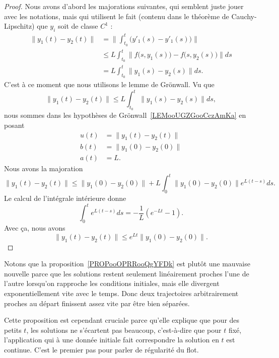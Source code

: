 \begin{proof}
	Nous avons d'abord les majorations suivantes, qui semblent juste jouer avec les notations, mais qui utilisent le fait (contenu dans le théorème de Cauchy-Lipschitz) que \( y_i\) soit de classe \( C^1\) :
	\begin{subequations}
		\begin{align}
			\| y_1(t)-y_2(t) \| & =\| \int_{t_0}^t\big( y'_1(s)-y'_1(s) \big) \|                        \\
			                    & \leq L\int_{t_0}^t\| f\big( s,y_1(s) \big)-f\big( s,y_2(s) \big) \|ds \\
			                    & =L\int_{t_0}^t\| y_1(s)-y_2(s) \|ds.
		\end{align}
	\end{subequations}
	C'est à ce moment que nous utilisons le lemme de Grönwall. Vu que
	\begin{equation}
		\| y_1(t)-y_2(t) \|\leq L\int_{t_0}^t\| y_1(s)-y_2(s) \|ds,
	\end{equation}
	nous sommes dans les hypothèses de Grönwall~\ref{LEMooUGZGooCczAmKa} en posant
	\begin{subequations}
		\begin{align}
			u(t) & =\| y_1(t)-y_2(t) \| \\
			b(t) & =\| y_1(0)-y_2(0) \| \\
			a(t) & =L.
		\end{align}
	\end{subequations}
	Nous avons la majoration
	\begin{equation}
		\| y_1(t)-y_2(t) \|\leq \| y_1(0)-y_2(0) \|+L\int_0^t\| y_1(0)-y_2(0) \| e^{L(t-s)}ds.
	\end{equation}
	Le calcul de l'intégrale intérieure donne
	\begin{equation}
		\int_0^t e^{L(t-s)}ds=-\frac{1}{ L }( e^{-Lt}-1).
	\end{equation}
	Avec ça, nous avons
	\begin{equation}
		\| y_1(t)-y_2(t) \|\leq  e^{Lt}\| y_1(0)-y_2(0) \|.
	\end{equation}
\end{proof}

\begin{normaltext}
	Notons que la proposition~\ref{PROPooOPRRooQgYFDk} est plutôt une mauvaise nouvelle parce que les solutions restent seulement linéairement proches l'une de l'autre lorsqu'on rapproche les conditions initiales, mais elle divergent exponentiellement vite avec le temps. Donc deux trajectoires arbitrairement proches au départ finissent assez vite par être bien séparées.

	Cette proposition est cependant cruciale parce qu'elle explique que pour des petits \( t\), les solutions ne s'écartent pas beaucoup, c'est-à-dire que pour \( t\) fixé, l'application qui à une donnée initiale fait correspondre la solution en \( t\) est continue. C'est le premier pas pour parler de régularité du flot.

\end{normaltext}

